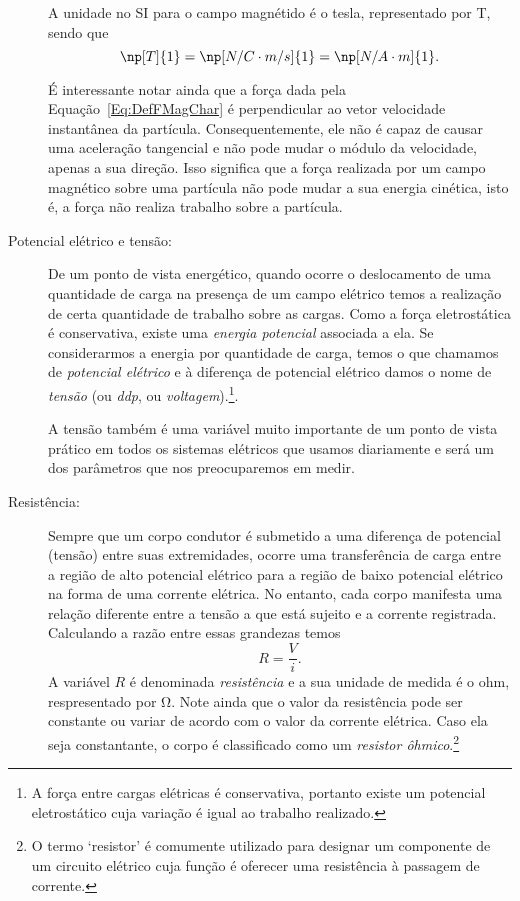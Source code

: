 \begin{description}
    A unidade no SI para o campo magnétido é o tesla, representado por T, sendo que
    \begin{equation}
        \np[T]{1} = \np[N/C\cdot m/s]{1} = \np[N/A\cdot m]{1}.
    \end{equation}
    
    É interessante notar ainda que a força dada pela Equação~\ref{Eq:DefFMagChar} é perpendicular ao vetor velocidade instantânea da partícula. Consequentemente, ele não é capaz de causar uma aceleração tangencial e não pode mudar o módulo da velocidade, apenas a sua direção. Isso significa que a força realizada por um campo magnético sobre uma partícula não pode mudar a sua energia cinética, isto é, a força não realiza trabalho sobre a partícula.
    
    \item[Potencial elétrico e tensão:] De um ponto de vista energético, quando ocorre o deslocamento de uma quantidade de carga na presença de um campo elétrico temos a realização de certa quantidade de trabalho sobre as cargas. Como a força eletrostática é conservativa, existe uma \emph{energia potencial} associada a ela. Se considerarmos a energia por quantidade de carga, temos o que chamamos de \emph{potencial elétrico} e à diferença de potencial elétrico  damos o nome de \emph{tensão} (ou \emph{ddp}, ou \emph{voltagem}).\footnote{A força entre cargas elétricas é conservativa, portanto existe um potencial eletrostático cuja variação é igual ao trabalho realizado.}.
    
    A tensão também é uma variável muito importante de um ponto de vista prático em todos os sistemas elétricos que usamos diariamente e será um dos parâmetros que nos preocuparemos em medir.
    
    \item[Resistência:] Sempre que um corpo condutor é submetido a uma diferença de potencial (tensão) entre suas extremidades, ocorre uma transferência de carga entre a região de alto potencial elétrico para a região de baixo potencial elétrico na forma de uma corrente elétrica. No entanto, cada corpo manifesta uma relação diferente entre a tensão a que está sujeito e a corrente registrada. Calculando a razão entre essas grandezas temos
    \begin{equation}
        R = \frac{V}{i}.
    \end{equation}
    A variável $R$ é denominada \emph{resistência} e a sua unidade de medida é o ohm, respresentado por \si{\ohm}. Note ainda que o valor da resistência pode ser constante ou variar de acordo com o valor da corrente elétrica. Caso ela seja constantante, o corpo é classificado como um \emph{resistor ôhmico}.\footnote{O termo `resistor' é comumente utilizado para designar um componente de um circuito elétrico cuja função é oferecer uma resistência à passagem de corrente.}
    
\end{description}

